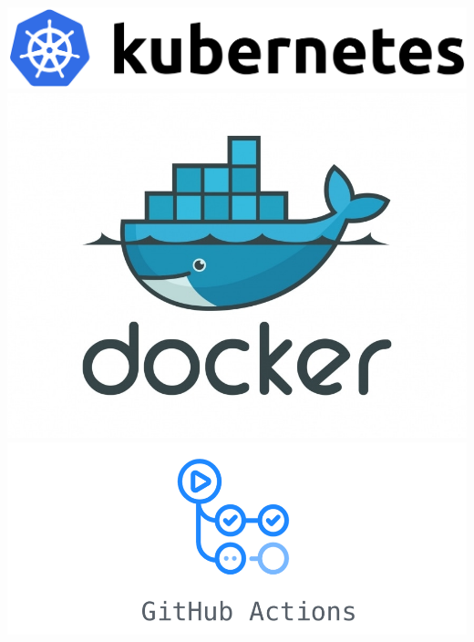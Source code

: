 \documentclass{article}
\begin{document}
\includegraphics[scale=.05]{figures/kubernetes-logo.png}
\includegraphics[scale=.07]{figures/docker-logo.jpg}
\includegraphics[scale=.1]{figures/github_actions-logo.png}
\end{document}
